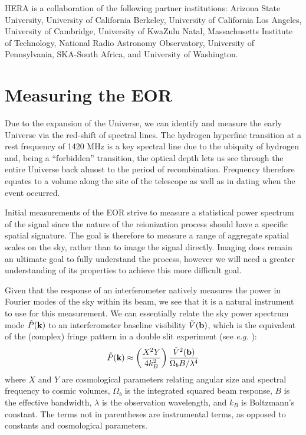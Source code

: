 \documentclass{ICEAA-IEEE_APWC}
\newcommand{\kvec}{{\bf k}}
\newcommand{\bvec}{{\bf b}}
\begin{document}
HERA is a collaboration of the following partner institutions:  Arizona State University, University of California Berkeley, University of California Los Angeles, University of Cambridge, University of KwaZulu Natal, Massachusetts Institute of Technology, National Radio Astronomy Observatory, University of Pennsylvania, SKA-South Africa, and
University of Washington.

\section{Measuring the EOR}
\label{sec:eormeas}
Due to the expansion of the Universe, we can identify and measure the early Universe via the red-shift of spectral lines.  The hydrogen hyperfine transition at a rest frequency of 1420 MHz is a key spectral line due to the ubiquity of hydrogen and, being a ``forbidden'' transition, the optical depth lets us see through the entire Universe back almost to the period of recombination.  Frequency therefore equates to a volume along the site of the telescope as well as in dating when the event occurred. 

Initial measurements of the EOR strive to measure a statistical power spectrum of the signal since the nature of the reionization process should have a specific spatial signature.  The goal is therefore to measure a range of aggregate spatial scales on the sky, rather than to image the signal directly.  Imaging does remain an ultimate goal to fully understand the process, however we will need a greater understanding of its properties to achieve this more difficult goal.  

Given that the response of an interferometer natively measures the power in Fourier modes of the sky within its beam, we see that it is a natural instrument to use for this measurement.  We can essentially relate the sky power spectrum mode ${\hat P}(\kvec)$ to an interferometer baseline visibility ${\tilde V}(\bvec)$, which is the equivalent of the (complex) fringe pattern in a double slit experiment (see {\em e.g.} \cite{2012ApJ...756..165P}):
\begin{equation}
{\hat P}(\kvec) \approx \left(\frac{X^2Y}{4k_B^2}\right) \frac{{\tilde V}^2(\bvec)}{\Omega_b B/ \lambda^4} 
\end{equation}
where $X$ and $Y$ are cosmological parameters relating angular size and spectral frequency to cosmic volumes, $\Omega_b$ is the integrated squared beam response, $B$ is the effective bandwidth, $\lambda$ is the observation wavelength, and $k_B$ is Boltzmann's constant.  The terms not in parentheses are instrumental terms, as opposed to constants and cosmological parameters.
\end{document}
